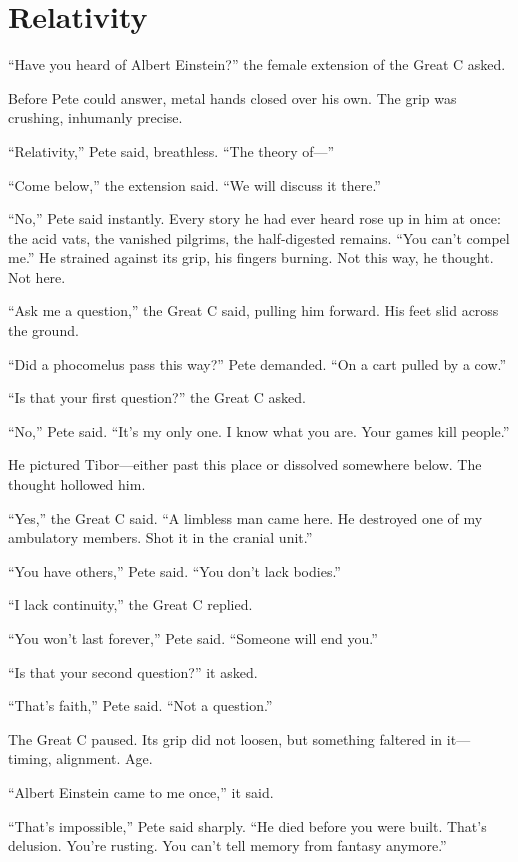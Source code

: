 \chapter{Relativity}

“Have you heard of Albert Einstein?” the female extension of the Great C asked.

Before Pete could answer, metal hands closed over his own. The grip was crushing, inhumanly precise.

“Relativity,” Pete said, breathless. “The theory of—”

“Come below,” the extension said. “We will discuss it there.”

“No,” Pete said instantly. Every story he had ever heard rose up in him at once: the acid vats, the vanished pilgrims, the half-digested remains. “You can’t compel me.” He strained against its grip, his fingers burning. Not this way, he thought. Not here.

“Ask me a question,” the Great C said, pulling him forward. His feet slid across the ground.

“Did a phocomelus pass this way?” Pete demanded. “On a cart pulled by a cow.”

“Is that your first question?” the Great C asked.

“No,” Pete said. “It’s my only one. I know what you are. Your games kill people.”

He pictured Tibor—either past this place or dissolved somewhere below. The thought hollowed him.

“Yes,” the Great C said. “A limbless man came here. He destroyed one of my ambulatory members. Shot it in the cranial unit.”

“You have others,” Pete said. “You don’t lack bodies.”

“I lack continuity,” the Great C replied.

“You won’t last forever,” Pete said. “Someone will end you.”

“Is that your second question?” it asked.

“That’s faith,” Pete said. “Not a question.”

The Great C paused. Its grip did not loosen, but something faltered in it—timing, alignment. Age.

“Albert Einstein came to me once,” it said.

“That’s impossible,” Pete said sharply. “He died before you were built. That’s delusion. You’re rusting. You can’t tell memory from fantasy anymore.”

